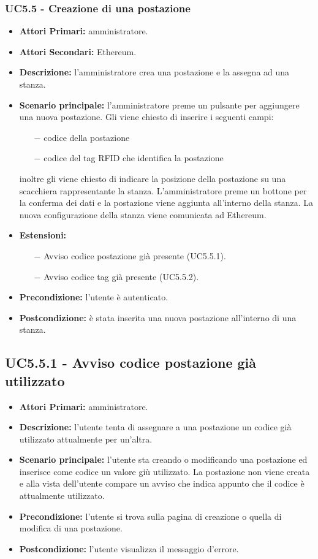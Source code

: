 \subsubsection{ UC5.5 - Creazione di una postazione}
\begin{itemize}
	\item\textbf{Attori Primari:}
	amministratore.
	\item\textbf{Attori Secondari:}
	Ethereum.
	\item\textbf{Descrizione:}
	l'amministratore crea una postazione e la assegna ad una stanza.
	\item\textbf{Scenario principale:} 
	l'amministratore preme un pulsante per aggiungere una nuova postazione. Gli viene chiesto di inserire i seguenti campi:
	\begin{itemize}
		\item[$-$] codice della postazione
		\item[$-$] codice del tag RFID che identifica la postazione
	\end{itemize}
	inoltre gli viene chiesto di indicare la posizione della postazione su una scacchiera rappresentante la stanza.
	L'amministratore preme un bottone per la conferma dei dati e la postazione viene aggiunta all'interno della stanza. La nuova configurazione della stanza viene comunicata ad Ethereum.
	\item\textbf{Estensioni:}
	\begin{itemize}
		\item[$-$] Avviso codice postazione già presente (UC5.5.1).
		\item[$-$] Avviso codice tag già presente (UC5.5.2).
	\end{itemize}
	\item\textbf{Precondizione:} 
	l'utente è autenticato.
	\item\textbf{Postcondizione:}
	è stata inserita una nuova postazione all'interno di una stanza.
\end{itemize}



\subsection{ UC5.5.1 - Avviso codice postazione già utilizzato}
\begin{itemize}
	\item\textbf{Attori Primari:}
	amministratore.
	\item\textbf{Descrizione:}
	l'utente tenta di assegnare a una postazione un codice già utilizzato attualmente per un'altra.
	\item\textbf{Scenario principale:}
	l'utente sta creando o modificando una postazione ed inserisce come codice un valore giù utilizzato.
	La postazione non viene creata e alla vista dell'utente compare un avviso che indica appunto che il codice è attualmente utilizzato.
	\item\textbf{Precondizione:}
	l'utente si trova sulla pagina di creazione o quella di modifica di una postazione.
	\item\textbf{Postcondizione:}
	l'utente visualizza il messaggio d'errore.
\end{itemize}

